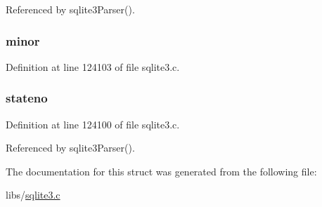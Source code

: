 Referenced by sqlite3\+Parser().

\hypertarget{structyy_stack_entry_ae9380fcd3ab9ffa6c6624cba73807585}{}
\subsubsection[{minor}]{ minor}\label{structyy_stack_entry_ae9380fcd3ab9ffa6c6624cba73807585}


Definition at line 124103 of file sqlite3.\+c.

\hypertarget{structyy_stack_entry_a29bdc76b71291cde3297dfbf76dc0ab6}{}
\subsubsection[{stateno}]{ stateno}\label{structyy_stack_entry_a29bdc76b71291cde3297dfbf76dc0ab6}


Definition at line 124100 of file sqlite3.\+c.



Referenced by sqlite3\+Parser().



The documentation for this struct was generated from the following file\+:\begin{DoxyCompactItemize}
\item 
libs/\hyperlink{sqlite3_8c}{sqlite3.\+c}\end{DoxyCompactItemize}

